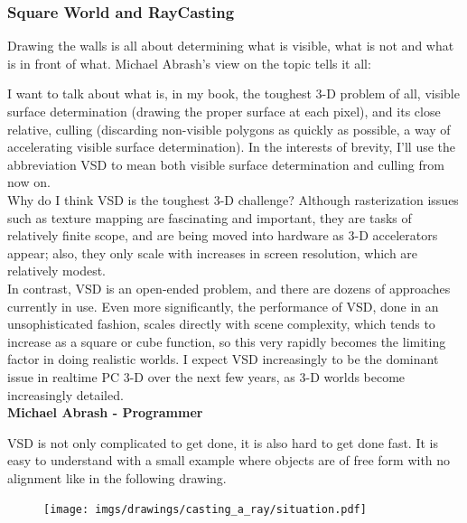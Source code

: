 \subsubsection{Square World and RayCasting}
Drawing the walls is all about determining what is visible, what is not and what is in front of what. Michael Abrash's view on the topic tells it all:\\
\par
\begin{fancyquotes}
I want to talk about what is, in my book, the toughest 3-D problem of all, visible surface determination (drawing the proper surface at each pixel), and its close relative, culling (discarding non-visible polygons as quickly as possible, a way of accelerating visible surface determination). In the interests of brevity, I'll use the abbreviation VSD to mean both visible surface determination and culling from now on.
 \bigskip \\
Why do I think VSD is the toughest 3-D challenge? Although rasterization issues such as texture mapping are fascinating and important, they are tasks of relatively finite scope, and are being moved into hardware as 3-D accelerators appear; also, they only scale with increases in screen resolution, which are relatively modest.
 \bigskip \\
In contrast, VSD is an open-ended problem, and there are dozens of approaches currently in use. Even more significantly, the performance of VSD, done in an unsophisticated fashion, scales directly with scene complexity, which tends to increase as a square or cube function, so this very rapidly becomes the limiting factor in doing realistic worlds. I expect VSD increasingly to be the dominant issue in realtime PC 3-D over the next few years, as 3-D worlds become increasingly detailed.
 \bigskip \\
\textbf{Michael Abrash - Programmer}
 \end{fancyquotes}
 \par
VSD is not only complicated to get done, it is also hard to get done fast. It is easy to understand with a small example where objects are of free form with no alignment like in the following drawing.

\par
\begin{figure}[H]
\centering
\texttt{[image: imgs/drawings/casting\_a\_ray/situation.pdf]}
\end{figure}

